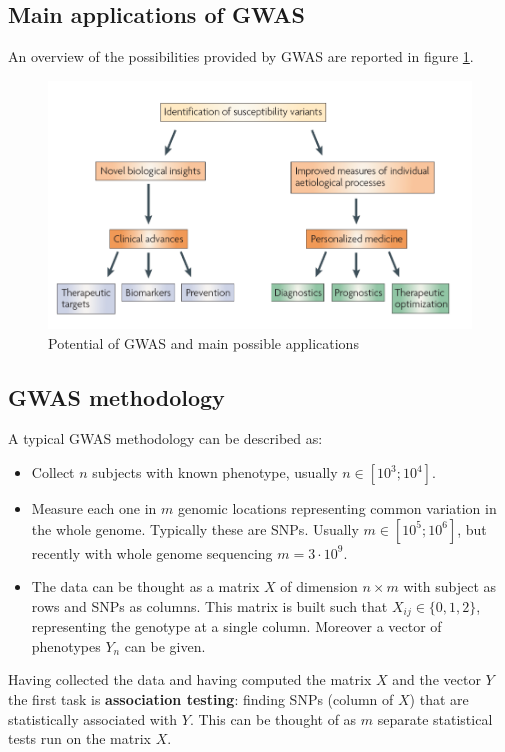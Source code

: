 	\subsection{Main applications of GWAS}
	 An overview of the possibilities provided by GWAS are reported in figure \ref{fig:potential}.
	 \begin{figure}
	 \centering
	 \includegraphics[scale=0.3]{potential}
	 \caption{Potential of GWAS and main possible applications}
	 \label{fig:potential}
	 \end{figure}
	 

	\subsection{GWAS methodology}
	A typical GWAS methodology can be described as:

		\begin{itemize}
			\item Collect $n$ subjects with known phenotype, usually $n\in [10^3;10^4]$.
			\item Measure each one in $m$ genomic locations representing common variation in the whole genome.
				Typically these are SNPs.
				Usually $m\in [10^5;10^6]$, but recently with whole genome sequencing $m = 3\cdot 10^9$.
			\item The data can be thought as a matrix $X$ of dimension $n \times m$ with subject as rows and SNPs as columns.
				This matrix is built such that $X_{ij} \in \{0,1,2\}$, representing the genotype at a single column.
				Moreover a vector of phenotypes $Y_n$ can be given.
		\end{itemize}

	Having collected the data and having computed the matrix $X$ and the vector $Y$ the first task is \textbf{association testing}: finding SNPs (column of $X$) that are statistically associated with $Y$.
	This can be thought of as $m$ separate statistical tests run on the matrix $X$.

